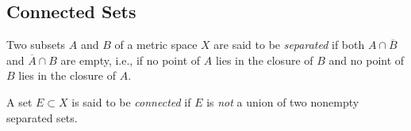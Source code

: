 \documentclass[../poma-notes.tex]{subfiles}
\begin{document}
\subsection*{Connected Sets}

\begin{definition}
  Two subsets $A$ and $B$ of a metric space $X$ are said to be \textit{separated} if both $A \cap \overline{B}$
  and $\overline{A} \cap B$ are empty, i.e., if no point of $A$ lies in the closure of $B$ and no point of $B$
  lies in the closure of $A$.

  A set $E \subset X$ is said to be \textit{connected} if $E$ is \textit{not} a union of two nonempty separated
  sets.
\end{definition}
\end{document}
